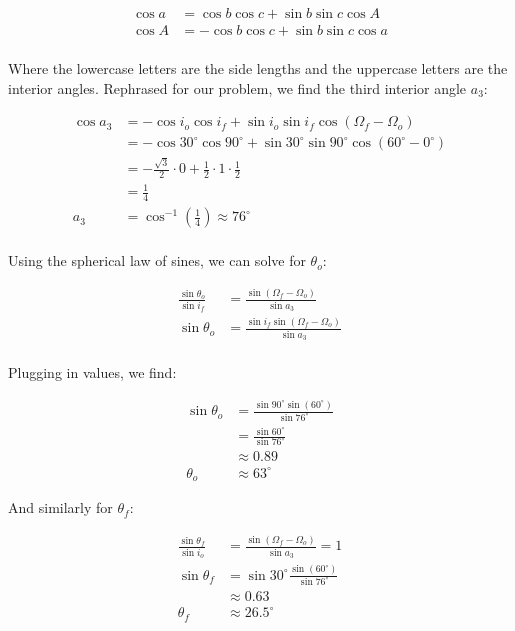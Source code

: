 \begin{align*}
    \cos a &= \cos b \cos c + \sin b \sin c \cos A \\
    \cos A &= - \cos b \cos c + \sin b \sin c \cos a \\
\end{align*}

Where the lowercase letters are the side lengths and the uppercase letters are the interior angles. Rephrased for our problem, we find the third interior angle $a_3$:

\begin{align*}
    \cos a_3 &= - \cos i_o \cos i_f + \sin i_o \sin i_f \cos(\Omega_f - \Omega_o) \\
    &= - \cos 30^\circ \cos 90^\circ + \sin 30^\circ \sin 90^\circ \cos(60^\circ - 0^\circ) \\
    &= - \frac{\sqrt{3}}{2} \cdot 0 + \frac{1}{2} \cdot 1 \cdot \frac{1}{2} \\
    &= \frac{1}{4} \\
    a_3 &= \cos^{-1} \left( \frac{1}{4} \right) \approx 76^\circ \\
\end{align*}

Using the spherical law of sines, we can solve for $\theta_o$:

\begin{align*}
    \frac{\sin\theta_o}{\sin i_f} &= \frac{\sin(\Omega_f - \Omega_o)}{\sin a_3} \\
    \sin\theta_o &= \frac{\sin i_f \sin(\Omega_f - \Omega_o)}{\sin a_3} \\
\end{align*}

Plugging in values, we find:

\begin{align*}
    \sin\theta_o &= \frac{\sin 90^\circ \sin(60^\circ)}{\sin 76^\circ} \\
    &= \frac{\sin 60^\circ}{\sin 76^\circ} \\
    &\approx 0.89 \\
    \theta_o &\approx 63^\circ
\end{align*}

And similarly for $\theta_f$:

\begin{align*}
    \frac{\sin\theta_f}{\sin i_o} &= \frac{\sin(\Omega_f - \Omega_o)}{\sin a_3} = 1 \\
    \sin\theta_f &= \sin 30^\circ \frac{\sin(60^\circ)}{\sin 76^\circ} \\
    &\approx 0.63 \\
    \theta_f &\approx 26.5^\circ
\end{align*}

